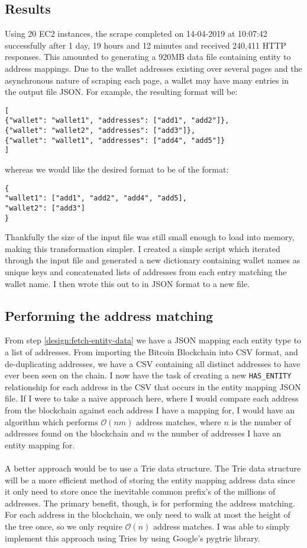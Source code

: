 \subsection{Results}
Using 20 EC2 instances, the scrape completed on 14-04-2019 at 10:07:42 successfully after 1 day, 19 hours and 12 minutes and received 240,411 HTTP responses. This amounted to generating a 920MB data file containing entity to address mappings. Due to the wallet addresses existing over several pages and the asynchronous nature of scraping each page, a wallet may have many entries in the output file JSON. For example, the resulting format will be:

\begin{lstlisting}
[
{"wallet": "wallet1", "addresses": ["add1", "add2"]},
{"wallet": "wallet2", "addresses": ["add3"]},
{"wallet": "wallet1", "addresses": ["add4", "add5"]}
]
\end{lstlisting}

whereas we would like the desired format to be of the format:

\begin{lstlisting}
{
"wallet1": ["add1", "add2", "add4", "add5],
"wallet2": ["add3"]
}
\end{lstlisting}
Thankfully the size of the input file was still small enough to load into memory, making this transformation simpler. I created a simple script which iterated through the input file and generated a new dictionary containing wallet names as unique keys and concatenated lists of addresses from each entry matching the wallet name. I then wrote this out to in JSON format to a new file. 

\subsection{Performing the address matching}\label{address-matching-trie}
From step \ref{design:fetch-entity-data} we have a JSON mapping each entity type to a list of addresses. From importing the Bitcoin Blockchain into CSV format, and de-duplicating addresses, we have a CSV containing all distinct addresses to have ever been seen on the chain. I now have the task of creating a new \texttt{HAS\_ENTITY} relationship for each address in the CSV that occurs in the entity mapping JSON file. If I were to take a naive approach here, where I would compare each address from the blockchain against each address I have a mapping for, I would have an algorithm which performs $\mathcal{O}(nm)$ address matches, where $n$ is the number of addresses found on the blockchain and $m$ the number of addresses I have an entity mapping for. 
\\\\
A better approach would be to use a Trie data structure. The Trie data structure will be a more efficient method of storing the entity mapping address data since it only need to store once the inevitable common prefix's of the millions of addresses. The primary benefit, though, is for performing the address matching. For each address in the blockchain, we only need to walk at most the height of the tree once, so we only require $\mathcal{O}(n)$ address matches. I was able to simply implement this approach using Tries by using Google's pygtrie library. 